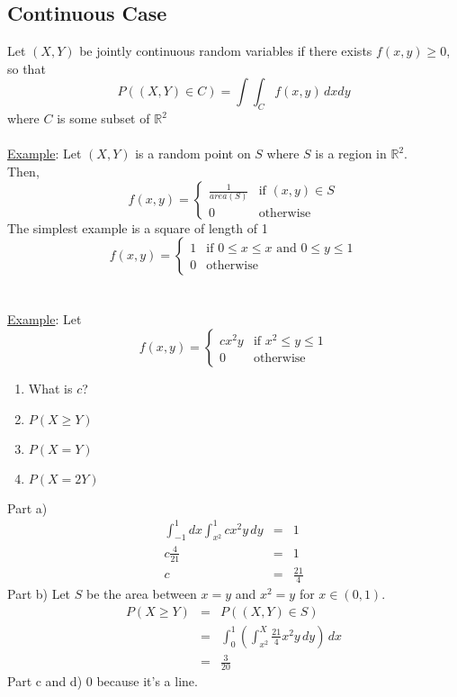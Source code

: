   \subsection*{Continuous Case}
    Let $(X,Y)$ be jointly continuous random variables if there exists $f(x,y)
      \ge 0$, so that 
      $$
        P((X,Y) \in C) = \int\int_C f(x,y)\,dxdy
      $$
      where $C$ is some subset of $\mathbb{R}^2$\\\\
    \underline{Example}: Let $(X,Y)$ is a random point on $S$ where $S$ is
      a region in $\mathbb{R}^2$.\\
      Then, 
      $$
        f(x,y) = \begin{cases} \frac{1}{area(S)} & \text{if } (x,y) \in S\\
        0 & \text{otherwise} \end{cases}
      $$
      The simplest example is a square of length of 1
      $$
        f(x,y) = \begin{cases} 1 & \text{if } 0 \le x \le x \text{ and } 0 \le
        y \le 1\\ 0 & \text{otherwise}\end{cases}
      $$\\\\
    \underline{Example}: Let
    $$
      f(x,y) = \begin{cases} cx^2y & \text{if } x^2 \le y \le 1\\ 0 & 
      \text{otherwise}\end{cases}
    $$
    \begin{enumerate}
      \item What is $c$?
      \item $P(X \ge Y)$
      \item $P(X = Y)$
      \item $P(X = 2Y)$
    \end{enumerate}

    Part a)
    \begin{eqnarray*}
      \int_{-1}^1 dx \int_{x^2}^1 cx^2y\,dy & = & 1\\
      c \frac{4}{21} & = & 1\\
      c & = & \frac{21}{4}
    \end{eqnarray*}
    Part b) Let $S$ be the area between $x = y$ and $x^2 = y$ for $x \in (0,1)$.
    \begin{eqnarray*}
      P(X \ge Y) & = & P((X,Y) \in S)\\
      & = & \int_0^1 (\int_{x^2}^X \frac{21}{4}x^2y\,dy)\,dx\\
      & = & \frac{3}{20}
    \end{eqnarray*}
    Part c and d) 0 because it's a line.
